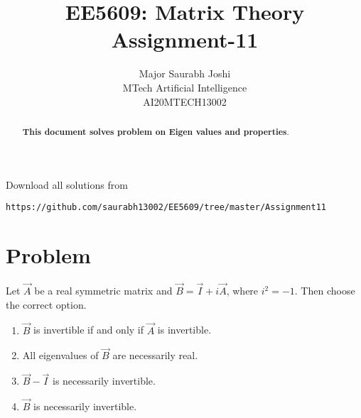 \documentclass[journal,12pt,twocolumn]{IEEEtran}
\begin{document}
     \def\rightbox#1{\makebox[0in][r]{#1}}
     \def\centbox#1{\makebox[0in]{#1}}
     \def\topbox#1{\raisebox{-\baselineskip}[0in][0in]{#1}}
     \def\midbox#1{\raisebox{-0.5\baselineskip}[0in][0in]{#1}}
\vspace{3cm}
\onecolumn
\title{EE5609: Matrix Theory\\
          Assignment-11\\}
\author{Major Saurabh Joshi\\MTech Artificial Intelligence\\AI20MTECH13002 }
\maketitle
\bigskip
\renewcommand{\thefigure}{\theenumi}
\renewcommand{\thetable}{\theenumi}
\begin{abstract}
\small\textbf{This document solves problem on Eigen values and properties}.
\end{abstract}
Download all solutions from 
\begin{lstlisting}
https://github.com/saurabh13002/EE5609/tree/master/Assignment11
\end{lstlisting}
\section{\textbf{Problem}}
Let $\vec{A}$ be a real symmetric matrix and  $\vec{B}=\vec{I}+i\vec{A}$, where $i^2=-1$. Then choose the correct option.\\
\begin{enumerate}
	\item  $\vec{B}$ is invertible if and only if $\vec{A}$ is invertible.\\
	\item All eigenvalues of $\vec{B}$ are necessarily real.\\
	\item $\vec{B}-\vec{I}$ is necessarily invertible.\\
	\item $\vec{B}$ is necessarily invertible.\\
\end{enumerate}
\end{document}
